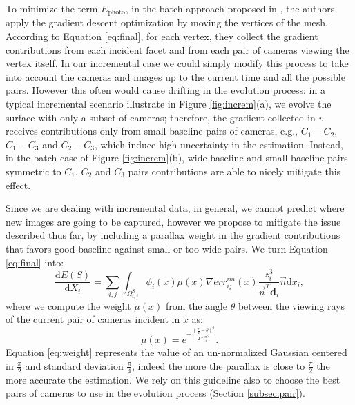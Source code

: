 \documentclass[times,10pt,twocolumn]{article}
\begin{document}
To minimize the term $E_{\textrm{photo}}$, in the batch approach proposed in \cite{vu_et_al_2012}, the authors apply  the gradient descent optimization by moving the vertices of the mesh.
According to Equation \eqref{eq:final}, for each vertex, they collect the gradient contributions from each incident facet and from each pair of cameras viewing the vertex itself.
In our incremental case we could simply modify this process to take into account the cameras and images up to the current time and all the possible pairs. 
However this often would cause drifting in the evolution process: in a typical incremental scenario illustrate in Figure \ref{fig:increm}(a), we evolve the surface with only a subset of cameras; therefore, the gradient collected in $v$ receives contributions  only from small baseline pairs of cameras, e.g., $C_1-C_2$, $C_1-C_3$ and $C_2-C_3$, which induce high uncertainty in the estimation.
Instead, in the batch case of Figure \ref{fig:increm}(b), wide baseline and  small baseline pairs symmetric to $C_1$, $C_2$ and $C_3$ pairs contributions are able to nicely mitigate this effect.


Since we are dealing with incremental data, in general, we cannot predict where new images are going to be captured, however we propose to mitigate the issue described thus far, by including a parallax weight in the gradient contributions that favors good baseline against small or too wide pairs.
We turn Equation \eqref{eq:final} into:
\begin{equation}
\label{eq:my_final}
  \frac{\textrm{d}E(\mathit{S})}{\textrm{d}X_i} = 
  \sum_{i,j} \int_{\Omega^{\textrm{S}}_{i,j}} 
  \phi_i(x)  \mu(x) \nabla err^{im}_{ij}(x)\frac{z_i^3}{\overrightarrow{n}^T \mathbf{d}_i }\overrightarrow{n} \textrm{d}x_i,
\end{equation}
where we compute the weight $\mu(x)$ from the angle $\theta$ between the viewing rays of the current pair of cameras incident in $x$ as:
\begin{equation}
\label{eq:weight}
\mu(x) = e^{-\frac{(\frac{\pi}{2}-\theta)^2}{2*\frac{\pi}{4}^2}}.
\end{equation}
Equation \eqref{eq:weight}  represents the value of an un-normalized Gaussian centered in $\frac{\pi}{2}$ and standard deviation $\frac{\pi}{4}$, indeed the more the parallax is close to $\frac{\pi}{2}$ the more accurate the estimation. 
We rely on this guideline also to choose the best pairs of cameras to use in the evolution process (Section \ref{subsec:pair}).
\end{document}
